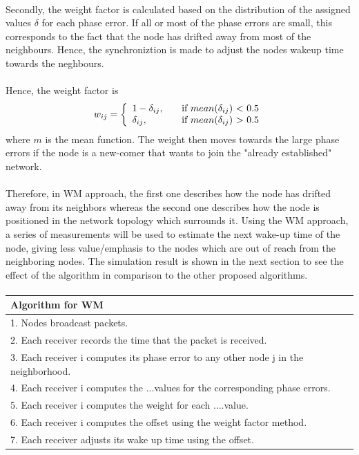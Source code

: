 \documentclass[a4paper,10pt]{report}
\begin{document}
\paragraph*{} \noindent
Secondly, the weight factor is calculated based on the distribution of the assigned values $\delta$ for each phase error. If all or most of the phase errors are small, this corresponds to the fact that the node has drifted away from most of the neighbours. Hence, the synchroniztion is made to adjust the nodes wakeup time towards the neghbours. \paragraph*{} \noindent
Hence, the weight factor is
\[w_{ij} = \left\{
\begin{array}{l l}
  1 - \delta_{ij},& \quad \mbox{if $mean(\delta_{ij}$) $<$ 0.5}\\
 \delta_{ij}, & \quad \mbox{if $mean(\delta_{ij}$) $>$ 0.5}\\ \end{array} \right. \]
where $m$ is the mean function.
The weight then moves towards the large phase errors if the node is a new-comer that wants to join the "already established" network.
\paragraph*{}
Therefore, in WM approach, the first one describes how the node has drifted away from its neighbors whereas the second one describes how the node is positioned in the network topology which surrounds it. Using the WM approach, a series of measurements will be used to estimate the next wake-up time of the node, giving less value/emphasis to the nodes which are out of reach from the neighboring nodes. The simulation result is shown in the next section to see the effect of the algorithm in comparison to the other proposed algorithms.\paragraph*{}
\begin{tabular}{  l }Algorithm for WM \\\hline \hline
1. Nodes broadcast packets. \\  2. Each receiver records the time that the packet is received. \\
3. Each receiver i computes its phase error to any other node j in the neighborhood. \\
4. Each receiver i computes the ...values for the corresponding phase errors. \\
5. Each receiver i computes the weight for each ....value. \\
6. Each receiver i computes the offset using the weight factor method. \\
7. Each receiver adjusts its wake up time using the offset.\\
\hline \hline
\end{tabular}
\end{document}

